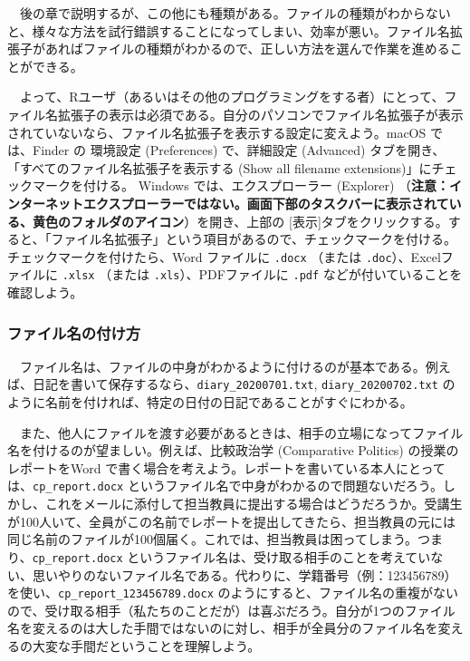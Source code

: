 \documentclass[
  a4paper,
  pandoc,
  ja=standard,
  jafont=haranoaji]{bxjsbook}
\begin{document}
　後の章で説明するが、この他にも種類がある。ファイルの種類がわからないと、様々な方法を試行錯誤することになってしまい、効率が悪い。ファイル名拡張子があればファイルの種類がわかるので、正しい方法を選んで作業を進めることができる。

　よって、Rユーザ（あるいはその他のプログラミングをする者）にとって、ファイル名拡張子の表示は必須である。自分のパソコンでファイル名拡張子が表示されていないなら、ファイル名拡張子を表示する設定に変えよう。macOS
では、Finder の 環境設定 (Preferences) で、詳細設定 (Advanced)
タブを開き、「すべてのファイル名拡張子を表示する (Show all filename
extensions)」にチェックマークを付ける。 Windows では、エクスプローラー
(Explorer)
（\textbf{注意：インターネットエクスプローラーではない。画面下部のタスクバーに表示されている、黄色のフォルダのアイコン}）を開き、上部の
{[}表示{]}タブをクリックする。すると、「ファイル名拡張子」という項目があるので、チェックマークを付ける。チェックマークを付けたら、Word
ファイルに \texttt{.docx} （または \texttt{.doc}）、Excelファイルに
\texttt{.xlsx} （または \texttt{.xls}）、PDFファイルに \texttt{.pdf}
などが付いていることを確認しよう。

\hypertarget{ux30d5ux30a1ux30a4ux30ebux540dux306eux4ed8ux3051ux65b9}{%
\subsubsection{ファイル名の付け方}\label{ux30d5ux30a1ux30a4ux30ebux540dux306eux4ed8ux3051ux65b9}}

　ファイル名は、ファイルの中身がわかるように付けるのが基本である。例えば、日記を書いて保存するなら、\texttt{diary\_20200701.txt},
\texttt{diary\_20200702.txt}
のように名前を付ければ、特定の日付の日記であることがすぐにわかる。

　また、他人にファイルを渡す必要があるときは、相手の立場になってファイル名を付けるのが望ましい。例えば、比較政治学
(Comparative Politics) の授業のレポートをWord
で書く場合を考えよう。レポートを書いている本人にとっては、\texttt{cp\_report.docx}
というファイル名で中身がわかるので問題ないだろう。しかし、これをメールに添付して担当教員に提出する場合はどうだろうか。受講生が100人いて、全員がこの名前でレポートを提出してきたら、担当教員の元には同じ名前のファイルが100個届く。これでは、担当教員は困ってしまう。つまり、\texttt{cp\_report.docx}
というファイル名は、受け取る相手のことを考えていない、思いやりのないファイル名である。代わりに、学籍番号（例：123456789）を使い、\texttt{cp\_report\_123456789.docx}
のようにすると、ファイル名の重複がないので、受け取る相手（私たちのことだが）は喜ぶだろう。自分が1つのファイル名を変えるのは大した手間ではないのに対し、相手が全員分のファイル名を変えるの大変な手間だということを理解しよう。
\end{document}
